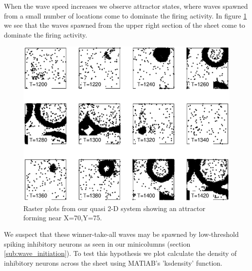 When the wave speed increases we observe attractor states, where waves spawned from a small number of locations come to dominate the firing activity.
In figure \ref{fig:2DWaveRasters_attractor} we see that the waves spawned from the upper right section of the sheet come to dominate the firing activity.
\begin{figure}[!htb]
 \caption{ Raster plots from our quasi 2-D system showing an attractor forming near X=70,Y=75.}
 \label{fig:2DWaveRasters_attractor}
 \centering
   \includegraphics[width=\textwidth]{fig/2DWaveRasters_Attractor_kappa0p1_seed35}
\end{figure}
We suspect that these winner-take-all waves may be spawned by low-threshold spiking inhibitory neurons as seen in our minicolumns (section \ref{sub:wave_initiation}).
To test this hypothesis we plot calculate the density of inhibitory neurons across the sheet using MATlAB's 'ksdensity' function.
